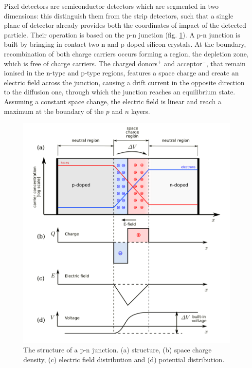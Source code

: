 Pixel detectors are semiconductor detectors which are segmented in two dimensions: this distinguish them from the strip detectors, such that a single plane of detector already provides both the coordinates of impact of the detected particle. 
Their operation is based on the p-n junction (fig. \ref{fig:junction}). A p-n junction is built by bringing in contact two n and p doped silicon crystals. At the boundary, recombination of both charge carriers occurs forming a region, the depletion zone, which is free of charge carriers. The charged donors$^{+}$ and acceptor$^{-}$, that remain ionised in the n-type and p-type regions, features a space charge and create an electric field across the junction, causing a drift current in the opposite direction to the diffusion one, through which the junction reaches an equilibrium state. Assuming a constant space change, the electric field is linear and reach a maximum at the boundary of the $p$ and $n$ layers.
\begin{figure}[h!]
   \centering
   \includegraphics[width=.69\linewidth]{figures/Pixel_detectors/junction.png}
   \caption{The structure of a p-n junction. (a) structure, (b) space charge density, (c) electric field distribution and (d) potential distribution. }
   \label{fig:junction}
\end{figure}

